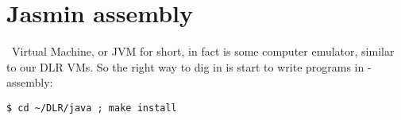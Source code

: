 \section{Jasmin assembly}

\noindent
\J\ Virtual Machine, or JVM for short, in fact is some computer emulator,
similar to our DLR VMs. So the right way to dig in is start to write programs in
\J-assembly:

\begin{lstlisting}
$ cd ~/DLR/java ; make install
\end{lstlisting}

